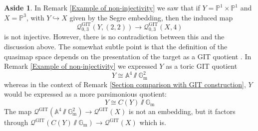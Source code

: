\documentclass[11pt]{amsart}
\newcommand{\PP}{\mathbb P}
\renewcommand{\to}{\rightarrow}
\newcommand{\Aaff}{\mathbb{A}}
\newcommand{\Gm}{\mathbb{G}_{\text{m}}}
\theoremstyle{definition}
\theoremstyle{definition}
\newtheorem{aside}[thm]{Aside}
\begin{document}
\begin{aside} In Remark \ref{Example of non-injectivity} we saw that if $Y=\PP^1 \times \PP^1$ and $X=\PP^3$, with $Y \hookrightarrow X$ given by the Segre embedding, then the induced map
\begin{equation*} \mathcal{Q}^{\operatorname{GIT}}_{0,3}(Y,(2,2)) \to \mathcal{Q}^{\operatorname{GIT}}_{0,3}(X,4)\end{equation*}
is not injective. However, there is no contradiction between this and the discussion above. The somewhat subtle point is that the definition of the quasimap space depends on the presentation of the target as a GIT quotient \cite[\S 4.6]{CFKM}. In Remark \ref{Example of non-injectivity} we expressed $Y$ as a toric GIT quotient
\begin{equation*} Y \cong \Aaff^4 \sslash \Gm^2 \end{equation*}
whereas in the context of Remark \ref{Section comparison with GIT construction}, $Y$ would be expressed as a more parsimonious quotient:
\begin{equation*} Y \cong C(Y) \sslash \Gm \end{equation*}
The map $\mathcal{Q}^{\operatorname{GIT}}(\Aaff^4\sslash\Gm^2) \to \mathcal{Q}^{\operatorname{GIT}}(X)$ is not an embedding, but it factors through $\mathcal{Q}^{\operatorname{GIT}}(C(Y)\sslash\Gm) \rightarrow \mathcal{Q}^{\operatorname{GIT}}(X)$ which is.

\end{aside}
\end{document}
